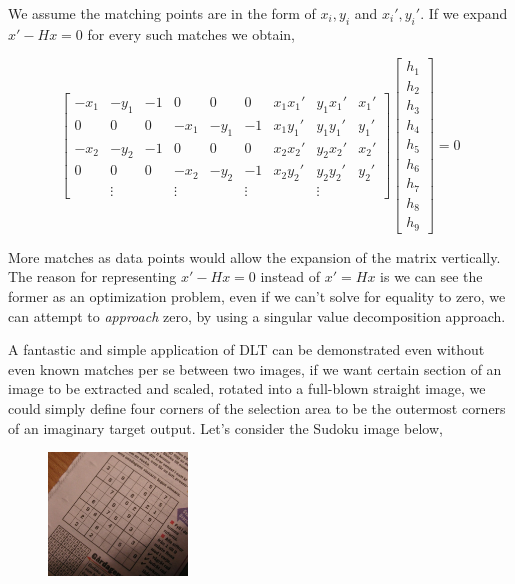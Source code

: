 \documentclass{article}
\begin{document}
We assume the matching points are in the form of $x_i,y_i$ and $x_i',y_i'$.  If
we expand $x' - Hx = 0$ for every such matches we obtain,

$$ 
\left[\begin{array}{rrrrrrrrr}
-x_1 & -y_1 & -1 & 0 & 0 & 0 & x_1x_1' & y_1x_1' & x_1' \\
0 & 0 & 0 & -x_1 & -y_1 & -1 & x_1y_1' & y_1y_1' & y_1' \\
-x_2 & -y_2 & -1 & 0 & 0 & 0 & x_2x_2' & y_2x_2' & x_2' \\
0 & 0 & 0 & -x_2 & -y_2 & -1 & x_2y_2' & y_2y_2' & y_2' \\
 &  \vdots &  &  \vdots &  & \vdots &  &  \vdots & 
\end{array}\right]
\left[\begin{array}{r}
h_1 \\ h_2 \\ h_3 \\ h_4 \\ h_5 \\ h_6 \\ h_7 \\ h_8 \\ h_9 
\end{array}\right] = 0
$$

More matches as data points would allow the expansion of the matrix vertically.
The reason for representing $x' - Hx = 0$ instead of $x'=Hx$ is we can see the
former as an optimization problem, even if we can't solve for equality to zero,
we can attempt to {\em approach} zero, by using a singular value decomposition
approach.

A fantastic and simple application of DLT can be demonstrated even without even
known matches per se between two images, if we want certain section of an image
to be extracted and scaled, rotated into a full-blown straight image, we could
simply define four corners of the selection area to be the outermost corners of
an imaginary target output. Let's consider the Sudoku image below,

\begin{figure}[h]
  \centering
  \includegraphics[width=10em]{sudoku81.jpg}
\end{figure}
\end{document}
